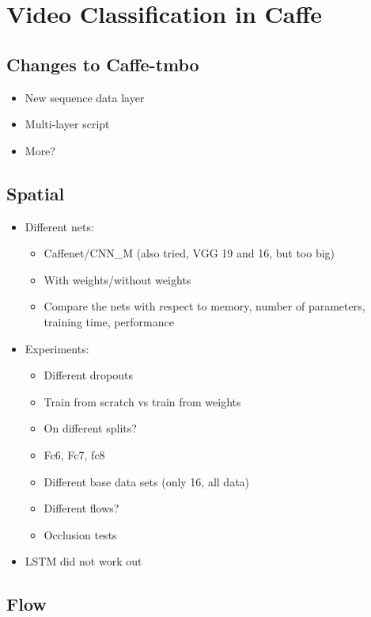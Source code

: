 \section{Video Classification in Caffe}
\label{sec:classification}

\subsection{Changes to Caffe-tmbo}

\begin{itemize}
	\item New sequence data layer
	\item Multi-layer script
	\item More?
\end{itemize}

\subsection{Spatial}

\begin{itemize}
	\item
		Different nets:
		\begin{itemize}
			\item Caffenet/CNN\_M (also tried, VGG 19 and 16, but too big)
			\item With weights/without weights
			\item Compare the nets with respect to memory, number of parameters, training time, performance
		\end{itemize}
	\item
		Experiments:
		\begin{itemize}
			\item Different dropouts
			\item Train from scratch vs train from weights
			\item On different splits?
			\item Fc6, Fc7, fc8
			\item Different base data sets (only 16, all data)
			\item Different flows?
			\item Occlusion tests
		\end{itemize}
	\item
		LSTM did not work out
\end{itemize}


\subsection{Flow}


